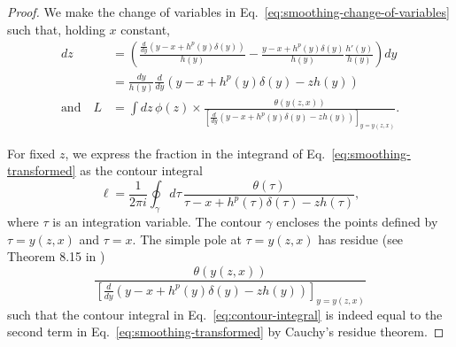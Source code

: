 \begin{proof}
We make the change of variables in Eq.~\eqref{eq:smoothing-change-of-variables} such that, holding $x$ constant, 
\begin{align}
dz & =\left(\frac{\frac{d}{dy}\left(y-x+h^{p}\left(y\right)\delta\left(y\right)\right)}{h\left(y\right)}-\frac{y-x+h^{p}\left(y\right)\delta\left(y\right)}{h\left(y\right)}\frac{h'\left(y\right)}{h\left(y\right)}\right)dy\nonumber \\
 & =\frac{dy}{h\left(y\right)}\frac{d}{dy}\left(y-x+h^{p}\left(y\right)\delta\left(y\right)-zh\left(y\right)\right)\nonumber \\
\text{and}\quad L & =\int dz\,\phi\left(z\right)\times\frac{\theta\left(y\left(z,x\right)\right)}{\left[\frac{d}{dy}\left(y-x+h^{p}\left(y\right)\delta\left(y\right)-zh\left(y\right)\right)\right]_{y=y\left(z,x\right)}}.\label{eq:smoothing-transformed}
\end{align}


For fixed $z$, we express the fraction in the integrand of Eq.~\eqref{eq:smoothing-transformed} as the contour integral 
\begin{equation}
\ell=\frac{1}{2\pi i}\oint_{\gamma}d\tau\,\frac{\theta\left(\tau\right)}{\tau-x+h^{p}\left(\tau\right)\delta\left(\tau\right)-zh\left(\tau\right)},\label{eq:contour-integral}
\end{equation}
where $\tau$ is an integration variable. The contour $\gamma$ encloses the points defined by $\tau=y\left(z,x\right)$ and $\tau=x$. The simple pole at $\tau=y\left(z,x\right)$ has residue (see Theorem 8.15 in \citet{Howie2008}) 
\[
\frac{\theta\left(y\left(z,x\right)\right)}{\left[\frac{d}{dy}\left(y-x+h^{p}\left(y\right)\delta\left(y\right)-zh\left(y\right)\right)\right]_{y=y\left(z,x\right)}}
\]
such that the contour integral in Eq.~\eqref{eq:contour-integral} is indeed equal to the second term in Eq.~\eqref{eq:smoothing-transformed} by Cauchy's residue theorem.


\end{proof}
